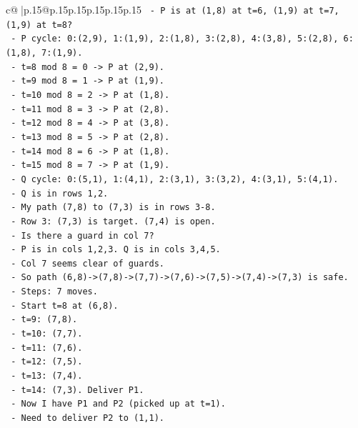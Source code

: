 \documentclass{article}
\begin{document}
{\begin{supertabular}{c@{$\;$}|p{.15\linewidth}@{}p{.15\linewidth}p{.15\linewidth}p{.15\linewidth}p{.15\linewidth}p{.15\linewidth}}
{{{\texttt{    {-} P is at (1,8) at t=6, (1,9) at t=7, (1,9) at t=8?} \\
\texttt{      {-} P cycle: 0:(2,9), 1:(1,9), 2:(1,8), 3:(2,8), 4:(3,8), 5:(2,8), 6:(1,8), 7:(1,9).} \\
\texttt{      {-} t=8 mod 8 = 0 {-}> P at (2,9).} \\
\texttt{      {-} t=9 mod 8 = 1 {-}> P at (1,9).} \\
\texttt{      {-} t=10 mod 8 = 2 {-}> P at (1,8).} \\
\texttt{      {-} t=11 mod 8 = 3 {-}> P at (2,8).} \\
\texttt{      {-} t=12 mod 8 = 4 {-}> P at (3,8).} \\
\texttt{      {-} t=13 mod 8 = 5 {-}> P at (2,8).} \\
\texttt{      {-} t=14 mod 8 = 6 {-}> P at (1,8).} \\
\texttt{      {-} t=15 mod 8 = 7 {-}> P at (1,9).} \\
\texttt{    {-} Q cycle: 0:(5,1), 1:(4,1), 2:(3,1), 3:(3,2), 4:(3,1), 5:(4,1).} \\
\texttt{    {-} Q is in rows 1,2.} \\
\texttt{    {-} My path (7,8) to (7,3) is in rows 3{-}8.} \\
\texttt{    {-} Row 3: (7,3) is target. (7,4) is open.} \\
\texttt{    {-} Is there a guard in col 7?} \\
\texttt{    {-} P is in cols 1,2,3. Q is in cols 3,4,5.} \\
\texttt{    {-} Col 7 seems clear of guards.} \\
\texttt{    {-} So path (6,8){-}>(7,8){-}>(7,7){-}>(7,6){-}>(7,5){-}>(7,4){-}>(7,3) is safe.} \\
\texttt{    {-} Steps: 7 moves.} \\
\texttt{    {-} Start t=8 at (6,8).} \\
\texttt{    {-} t=9: (7,8).} \\
\texttt{    {-} t=10: (7,7).} \\
\texttt{    {-} t=11: (7,6).} \\
\texttt{    {-} t=12: (7,5).} \\
\texttt{    {-} t=13: (7,4).} \\
\texttt{    {-} t=14: (7,3). Deliver P1.} \\
\texttt{    {-} Now I have P1 and P2 (picked up at t=1).} \\
\texttt{    {-} Need to deliver P2 to (1,1).} \\
}}}
\end{supertabular}}
\end{document}

